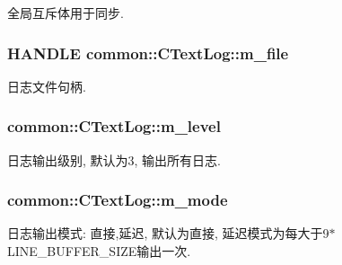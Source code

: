 全局互斥体用于同步. 

\hypertarget{classcommon_1_1_c_text_log_aee55c31c87ce36ba34f11e7503355351}{
\subsubsection[{m\+\_\+file}]{\setlength{\rightskip}{0pt plus 5cm}H\+A\+N\+D\+L\+E common\+::\+C\+Text\+Log\+::m\+\_\+file\hspace{0.3cm}{\ttfamily [private]}}}\label{classcommon_1_1_c_text_log_aee55c31c87ce36ba34f11e7503355351}


日志文件句柄. 

\hypertarget{classcommon_1_1_c_text_log_ad800d8c6a9cfb7357da2044cf4deeb25}{
\subsubsection[{m\+\_\+level}]{ common\+::\+C\+Text\+Log\+::m\+\_\+level\hspace{0.3cm}{\ttfamily [private]}}}\label{classcommon_1_1_c_text_log_ad800d8c6a9cfb7357da2044cf4deeb25}


日志输出级别, 默认为3, 输出所有日志. 

\hypertarget{classcommon_1_1_c_text_log_a3c4007ae4cddee7343b9fd158ca6d07d}{
\subsubsection[{m\+\_\+mode}]{ common\+::\+C\+Text\+Log\+::m\+\_\+mode\hspace{0.3cm}{\ttfamily [private]}}}\label{classcommon_1_1_c_text_log_a3c4007ae4cddee7343b9fd158ca6d07d}


日志输出模式\+: 直接,延迟, 默认为直接, 延迟模式为每大于9$\ast$\+L\+I\+N\+E\+\_\+\+B\+U\+F\+F\+E\+R\+\_\+\+S\+I\+Z\+E输出一次. 

